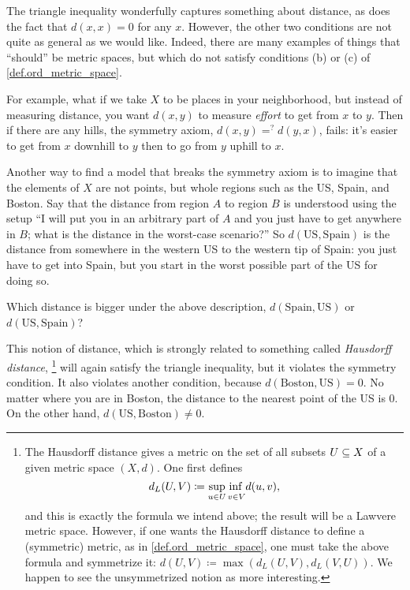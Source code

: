 \documentclass[7Sketches]{subfiles}
\begin{document}
The triangle inequality wonderfully captures something about distance, as does
the fact that $d(x,x)=0$ for any $x$. However, the other two conditions are not
quite as general as we would like. Indeed, there are many examples of things
that ``should'' be metric spaces, but which do not satisfy conditions (b) or
(c) of \cref{def.ord_metric_space}.

For example, what if we take $X$ to be places in your neighborhood, but instead of measuring distance, you want $d(x,y)$ to measure \emph{effort} to get from $x$ to $y$. Then if there are any hills, the symmetry axiom, $d(x,y)=^? d(y,x)$, fails: it's easier to get from $x$ downhill to $y$ then to go from $y$ uphill to $x$.%
%

Another way to find a model that breaks the symmetry axiom is to imagine that the elements of $X$ are not points, but whole regions such as the US, Spain, and Boston. Say that the distance from region $A$ to region $B$ is understood using the setup ``I will put you in an arbitrary part of $A$ and you just have to get anywhere in $B$; what is the distance in the worst-case scenario?'' So $d(\mathrm{US}, \mathrm{Spain})$ is the distance from somewhere in the western US to the western tip of Spain: you just have to get into Spain, but you start in the worst possible part of the US for doing so.%

\begin{exercise}%
\label{ex.regions_of_world}
Which distance is bigger under the above description, $d(\mathrm{Spain}, \mathrm{US})$ or $d(\mathrm{US}, \mathrm{Spain})$?
\end{exercise}

This notion of distance, which is strongly related to something called \emph{Hausdorff distance},%
\footnote{
The Hausdorff distance gives a metric on the set of all subsets $U\ss X$ of a given metric space $(X,d)$. One first defines
\[d_L(U,V)\coloneqq \sup_{u\in U}\underset{v \in V}{\inf\vphantom{p}}d(u,v),\]
and this is exactly the formula we intend above; the result will be a Lawvere
metric space. However, if one wants the Hausdorff distance to define a
(symmetric) metric, as in \cref{def.ord_metric_space}, one must take the above
formula and symmetrize it: $d(U,V)\coloneqq\max(d_L(U,V),d_L(V,U))$. We happen
to see the unsymmetrized notion as more interesting.
}%
will again satisfy the triangle inequality, but it violates the symmetry condition. It also violates another condition, because $d(\mathrm{Boston},\mathrm{US})=0$. No matter where you are in Boston, the distance to the nearest point of the US is 0. On the other hand, $d(\mathrm{US},\mathrm{Boston})\neq 0$.
\end{document}
